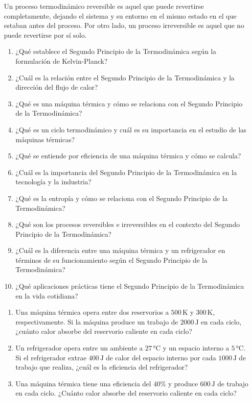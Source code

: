 \documentclass[../main]{subfiles}
\begin{document}
Un proceso termodinámico reversible es aquel que puede revertirse completamente, dejando el sistema y su entorno en el mismo estado en el que estaban antes del proceso. Por otro lado, un proceso irreversible es aquel que no puede revertirse por sí solo.

\begin{enumerate}
    \item ¿Qué establece el Segundo Principio de la Termodinámica según la formulación de Kelvin-Planck?
    \item ¿Cuál es la relación entre el Segundo Principio de la Termodinámica y la dirección del flujo de calor?
    \item ¿Qué es una máquina térmica y cómo se relaciona con el Segundo Principio de la Termodinámica?
    \item ¿Qué es un ciclo termodinámico y cuál es su importancia en el estudio de las máquinas térmicas?
    \item ¿Qué se entiende por eficiencia de una máquina térmica y cómo se calcula?
    \item ¿Cuál es la importancia del Segundo Principio de la Termodinámica en la tecnología y la industria?
    \item ¿Qué es la entropía y cómo se relaciona con el Segundo Principio de la Termodinámica?
    \item ¿Qué son los procesos reversibles e irreversibles en el contexto del Segundo Principio de la Termodinámica?
    \item ¿Cuál es la diferencia entre una máquina térmica y un refrigerador en términos de su funcionamiento según el Segundo Principio de la Termodinámica?
    \item ¿Qué aplicaciones prácticas tiene el Segundo Principio de la Termodinámica en la vida cotidiana?
\end{enumerate}

\begin{enumerate}
    \item Una máquina térmica opera entre dos reservorios a $500 \, \text{K}$ y $300 \, \text{K}$, respectivamente. Si la máquina produce un trabajo de $2000 \, \text{J}$ en cada ciclo, ¿cuánto calor absorbe del reservorio caliente en cada ciclo?
    \item Un refrigerador opera entre un ambiente a $27 \, \text{°C}$ y un espacio interno a $5 \, \text{°C}$. Si el refrigerador extrae $400 \, \text{J}$ de calor del espacio interno por cada $1000 \, \text{J}$ de trabajo que realiza, ¿cuál es la eficiencia del refrigerador?
    \item Una máquina térmica tiene una eficiencia del $40\%$ y produce $600 \, \text{J}$ de trabajo en cada ciclo. ¿Cuánto calor absorbe del reservorio caliente en cada ciclo?
    
\end{enumerate}
\end{document}
